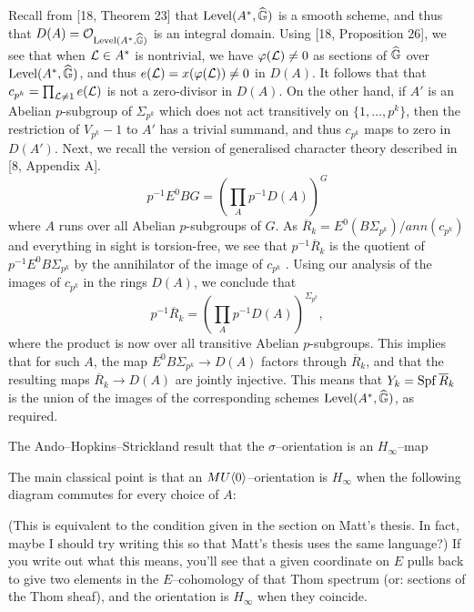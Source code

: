 Recall from [18, Theorem 23] that $\operatorname{Level}(A^*,\widehat{\mathbb G})$ is a smooth scheme, and thus that $D(A) = \mathcal{O}_{\operatorname{Level}(A^*,\widehat{\mathbb G})}$ is an integral domain. Using [18, Proposition 26], we see that when $\mathcal{L} \in A^*$ is nontrivial, we have $\varphi(\mathcal{L}) \ne 0$ as sections of $\widehat{\mathbb G}$ over $\operatorname{Level}(A^*, \widehat{\mathbb G})$, and thus $e(\mathcal{L}) = x(\varphi(\mathcal{L})) \ne 0$ in $D(A)$. It follows that that $c_{p^k} = \prod_{\mathcal{L} \ne 1} e(\mathcal{L})$ is not a zero-divisor in $D(A)$. On the other hand, if $A'$ is an Abelian $p$-subgroup of $\Sigma_{p^k}$ which does not act transitively on $\{1, \ldots, p^k\}$, then the restriction of $V_{p^k} − 1$ to $A'$ has a trivial summand, and thus $c_{p^k}$ maps to zero in $D(A')$. Next, we recall the version of generalised character theory described in [8, Appendix A].
\[p^{-1} E^0 BG = \left(\prod_A p^{-1} D(A)\right)^G\]
where $A$ runs over all Abelian $p$-subgroups of $G$. As $\overline R_k = E^0(B\Sigma_{p^k} )/ ann(c_{p^k} )$ and everything in sight is torsion-free, we see that $p^{−1} \overline R_k$ is the quotient of $p^{−1}E^0B\Sigma_{p^k}$ by the annihilator of the image of $c_{p^k}$ . Using our analysis of the images of $c_{p^k}$ in the rings $D(A)$, we conclude that
\[p^{-1} \overline R_k = \left(\prod_A p^{−1}D(A)\right)^{\Sigma_{p^k}},\]
where the product is now over all transitive Abelian $p$-subgroups. This implies that for such $A$, the map $E^0B\Sigma_{p^k} \to D(A)$ factors through $\overline R_k$, and that the resulting maps $\overline R_k \to D(A)$ are jointly injective. This means that $Y_k = \operatorname{Spf} \overline R_k$ is the union of the images of the corresponding schemes $\operatorname{Level}(A^*,\widehat{\mathbb G})$, as required.









The Ando--Hopkins--Strickland result that the $\sigma$--orientation is an $H_\infty$--map

The main classical point is that an $MU\langle0\rangle$--orientation is $H_\infty$ when the following diagram commutes for every choice of $A$:
\begin{center}
\end{center}
(This is equivalent to the condition given in the section on Matt's thesis.  In fact, maybe I should try writing this so that Matt's thesis uses the same language?)  If you write out what this means, you'll see that a given coordinate on $E$ pulls back to give two elements in the $E$--cohomology of that Thom spectrum (or: sections of the Thom sheaf), and the orientation is $H_\infty$ when they coincide.

